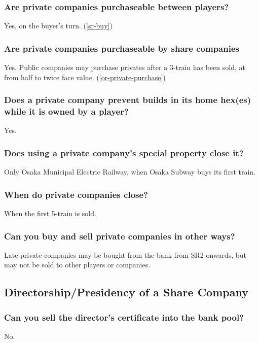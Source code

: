 \subsubsection{Are private companies purchaseable between players?}
Yes, on the buyer's turn. (\autoref{sr-buy})

\subsubsection{Are private companies purchaseable by share companies}
Yes. Public companies may purchase privates after a 3-train has been
sold, at from half to twice face value. (\autoref{or-private-purchase})

\subsubsection{Does a private company prevent builds in its home hex(es)
  while it is owned by a player?}
Yes.

\subsubsection{Does using a private company's special property close it?}
Only Osaka Municipal Electric Railway, when Osaka Subway buys its first train.

\subsubsection{When do private companies close?}
When the first 5-train is sold.

\subsubsection{Can you buy and sell private companies in other ways?}
Late private companies may be bought from the bank from SR2 onwards,
but may not be sold to other players or companies.

\subsection{Directorship/Presidency of a Share Company}

\subsubsection{Can you sell the director's certificate into the bank pool?}
No.

